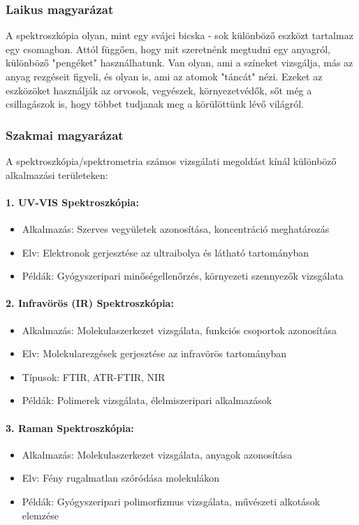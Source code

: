 \documentclass[a4paper,12pt]{article}
\begin{document}
\subsubsection{Laikus magyarázat} A spektroszkópia olyan, mint egy svájci bicska - sok különböző eszközt tartalmaz egy csomagban. Attól függően, hogy mit szeretnénk megtudni egy anyagról, különböző "pengéket" használhatunk. Van olyan, ami a színeket vizsgálja, más az anyag rezgéseit figyeli, és olyan is, ami az atomok "táncát" nézi. Ezeket az eszközöket használják az orvosok, vegyészek, környezetvédők, sőt még a csillagászok is, hogy többet tudjanak meg a körülöttünk lévő világról.

\subsubsection{Szakmai magyarázat} A spektroszkópia/spektrometria számos vizsgálati megoldást kínál különböző alkalmazási területeken:

\paragraph{1. UV-VIS Spektroszkópia:} \begin{itemize} \item Alkalmazás: Szerves vegyületek azonosítása, koncentráció meghatározás \item Elv: Elektronok gerjesztése az ultraibolya és látható tartományban \item Példák: Gyógyszeripari minőségellenőrzés, környezeti szennyezők vizsgálata \end{itemize}

\paragraph{2. Infravörös (IR) Spektroszkópia:} \begin{itemize} \item Alkalmazás: Molekulaszerkezet vizsgálata, funkciós csoportok azonosítása \item Elv: Molekularezgések gerjesztése az infravörös tartományban \item Típusok: FTIR, ATR-FTIR, NIR \item Példák: Polimerek vizsgálata, élelmiszeripari alkalmazások \end{itemize}

\paragraph{3. Raman Spektroszkópia:} \begin{itemize} \item Alkalmazás: Molekulaszerkezet vizsgálata, anyagok azonosítása \item Elv: Fény rugalmatlan szóródása molekulákon \item Példák: Gyógyszeripari polimorfizmus vizsgálata, művészeti alkotások elemzése \end{itemize}
\end{document}
